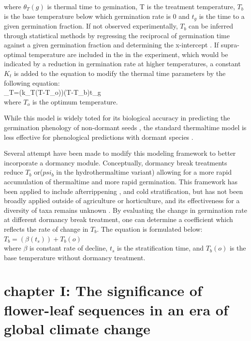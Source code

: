 \documentclass{article}\usepackage[]{graphicx}\usepackage[]{color}
\begin{document}
where $\theta_{T}(g)$ is thermal time to gemination, T is the treatment temperature, $T_b$ is the base temperature below which germination rate is 0 and $t_g$ is the time to a given germination fraction. If not observed experimentally, $T_b$ can be inferred through statistical methods by regressing the reciprocal of germination time against a given germination fraction and determining the x-intercept \citep{Pritchard1999}.
If supra-optimal temperature are included in the in the experiment, which would be indicated by a reduction in germination rate at higher temperatures, a constant $K_t$ is added to the equation to modify the thermal time parameters by the following equation:\\

\theta_{T}=(k_{T}(T-T_{o}))(T-T_{b})t_{g}\\

where $T_o$ is the optimum temperature.
\par While this model is widely toted for its biological accuracy in predicting the germination phenology of non-dormant seeds \citep{Bradford2005}, the standard thermaltime model is less effective for phenological predictions with dormant species \citep{Batlla2015}.
\par Several attempt have been made to modify this modeling framework to better incorporate a dormancy module. Conceptually, dormancy break treatments reduce $T_b$ or($psi_b$ in the hydrothermaltime variant) allowing for a more rapid accumulation of thermaltime and more rapid germination. This framework has been applied to include afterrippening \citep{Meyer2000}, and cold stratification\citep{Pritchard1996,Batlla2003}, but has not been broadly applied outside of agriculture or horticulture, and its effectiveness for a diversity of taxa remains unknown \citep{Steadman2004}. By evaluating the change in germination rate at different dormancy break treatment, one can determine a coefficient which reflects the rate of change in $T_b$. The equation is formulated below:\\

$T_b= (\beta(t_s))+T_b(o)$\\

where $\beta$ is constant rate of decline, $t_s$ is the stratification time, and $T_b(o)$ is the base temperature without dormancy treatment.

\section*{chapter I: The significance of flower-leaf sequences in an era of global climate change}
\end{document}
